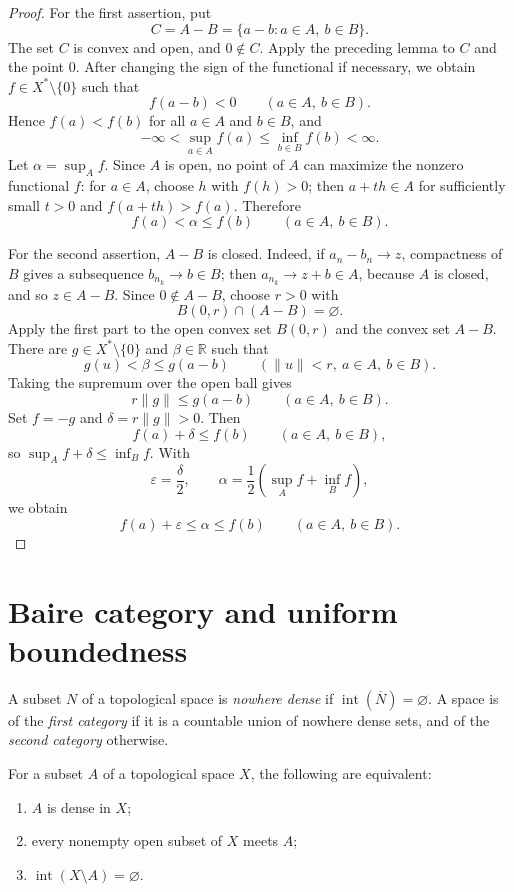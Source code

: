 \begin{proof}
For the first assertion, put
\[
  C=A-B=\{a-b:a\in A,\ b\in B\}.
\]
The set $C$ is convex and open, and $0\notin C$.  Apply the preceding lemma
to $C$ and the point $0$.  After changing the sign of the functional if
necessary, we obtain $f\in X^*\setminus\{0\}$ such that
\[
  f(a-b)<0
  \qquad(a\in A,\ b\in B).
\]
Hence $f(a)<f(b)$ for all $a\in A$ and $b\in B$, and
\[
  -\infty<\sup_{a\in A}f(a)
  \le\inf_{b\in B}f(b)<\infty.
\]
Let $\alpha=\sup_A f$.  Since $A$ is open, no point of $A$ can maximize the
nonzero functional $f$: for $a\in A$, choose $h$ with $f(h)>0$; then
$a+th\in A$ for sufficiently small $t>0$ and $f(a+th)>f(a)$.  Therefore
\[
  f(a)<\alpha\le f(b)
  \qquad(a\in A,\ b\in B).
\]

For the second assertion, $A-B$ is closed.  Indeed, if
$a_n-b_n\to z$, compactness of $B$ gives a subsequence $b_{n_k}\to b\in B$;
then $a_{n_k}\to z+b\in A$, because $A$ is closed, and so $z\in A-B$.
Since $0\notin A-B$, choose $r>0$ with
\[
  B(0,r)\cap(A-B)=\varnothing.
\]
Apply the first part to the open convex set $B(0,r)$ and the convex set
$A-B$.  There are $g\in X^*\setminus\{0\}$ and $\beta\in\mathbb R$ such
that
\[
  g(u)<\beta\le g(a-b)
  \qquad(\|u\|<r,\ a\in A,\ b\in B).
\]
Taking the supremum over the open ball gives
\[
  r\|g\|\le g(a-b)
  \qquad(a\in A,\ b\in B).
\]
Set $f=-g$ and $\delta=r\|g\|>0$.  Then
\[
  f(a)+\delta\le f(b)
  \qquad(a\in A,\ b\in B),
\]
so $\sup_Af+\delta\le\inf_Bf$.  With
\[
  \varepsilon=\frac\delta2,
  \qquad
  \alpha=\frac12\left(\sup_Af+\inf_Bf\right),
\]
we obtain
\[
  f(a)+\varepsilon\le\alpha\le f(b)
  \qquad(a\in A,\ b\in B).
\]
\end{proof}

\section{Baire category and uniform boundedness}

\begin{notedefinition}
A subset $N$ of a topological space is \emph{nowhere dense} if
$\operatorname{int}(\overline N)=\varnothing$.  A space is of the
\emph{first category} if it is a countable union of nowhere dense sets, and of
the \emph{second category} otherwise.
\end{notedefinition}

\begin{notelemma}
For a subset $A$ of a topological space $X$, the following are equivalent:
\begin{enumerate}
  \item $A$ is dense in $X$;
  \item every nonempty open subset of $X$ meets $A$;
  \item $\operatorname{int}(X\setminus A)=\varnothing$.
\end{enumerate}
\end{notelemma}

